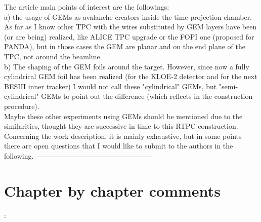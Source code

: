 \documentclass[a4paper,11pt,twoside]{article}
\begin{document}
The article main points of interest are the followings:\\
a)  the usage of GEMs as avalanche creators inside the time projection chamber. As far as I know other TPC with the wires substituted by GEM layers have been (or are being) realized, like ALICE TPC upgrade or the FOPI one (proposed for PANDA), but in those cases the GEM are planar and on the end plane of the TPC, not around the beamline.\\
b) The shaping of the GEM foils around the target. However, since now a fully cylindrical GEM foil has been realized (for the KLOE-2 detector and for the next BESIII inner tracker) I would not call these "cylindrical" GEMs, but "semi-cylindrical" GEMs to point out the difference (which reflects in the construction procedure).\\
Maybe these other experiments using GEMs should be mentioned due to the similarities, thought they are successive in time to this RTPC construction.
Concerning the work description, it is mainly exhaustive, but in some points there are open questions that I would like to submit to the authors in the following.
--------------------------------------------------

\section*{Chapter by chapter comments}:
\end{document}
